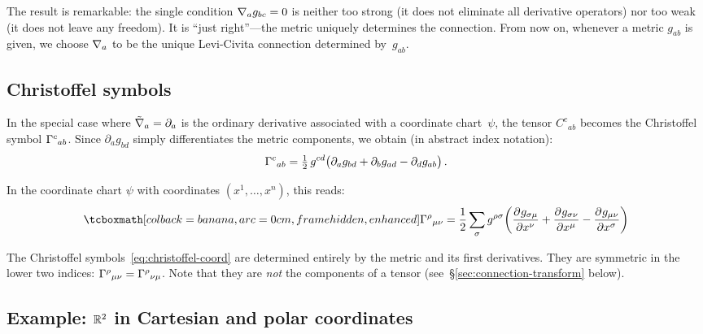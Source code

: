 \begin{remark}
  The result is remarkable: the single condition
  $\nabla_a g_{bc} = 0$ is neither too strong (it does not
  eliminate all derivative operators) nor too weak (it does not
  leave any freedom).  It is ``just right''---the metric uniquely
  determines the connection.  From now on, whenever a metric
  $g_{ab}$ is given, we choose $\nabla_a$ to be the unique
  Levi-Civita connection determined by~$g_{ab}$.
\end{remark}

\subsection{Christoffel symbols}\label{sec:christoffel}

In the special case where $\tilde{\nabla}_a = \partial_a$ is the
ordinary derivative associated with a coordinate chart~$\psi$,
the tensor $C^c{}_{ab}$ becomes the Christoffel symbol
$\Gamma^{c}{}_{ab}$.  Since $\partial_a g_{bd}$ simply
differentiates the metric components, we obtain
(in abstract index notation):
\begin{equation}\label{eq:christoffel-abstract}
  \Gamma^{c}{}_{ab}
    = \tfrac{1}{2}\, g^{cd}\bigl(
      \partial_a g_{bd}
      + \partial_b g_{ad}
      - \partial_d g_{ab}\bigr)\,.
\end{equation}

In the coordinate chart $\psi$ with coordinates
$(x^1,\dots,x^n)$, this reads:
\begin{equation}\label{eq:christoffel-coord}
  \eqbox{\chris{\rho}{\mu\nu}
    = \frac{1}{2}\sum_\sigma g^{\rho\sigma}
      \!\left(
        \pd{g_{\sigma\mu}}{x^\nu}
        + \pd{g_{\sigma\nu}}{x^\mu}
        - \pd{g_{\mu\nu}}{x^\sigma}
      \right)}
\end{equation}

\begin{keyresult}
  The Christoffel symbols~\eqref{eq:christoffel-coord} are
  determined entirely by the metric and its first derivatives.
  They are symmetric in the lower two indices:
  $\Gamma^{\rho}{}_{\mu\nu} = \Gamma^{\rho}{}_{\nu\mu}$.
  Note that they are \emph{not} the components of a tensor
  (see~\S\ref{sec:connection-transform} below).
\end{keyresult}

\subsection{Example: $\mathbb{R}^{2}$ in Cartesian and polar coordinates}%
\label{sec:R2-example}

